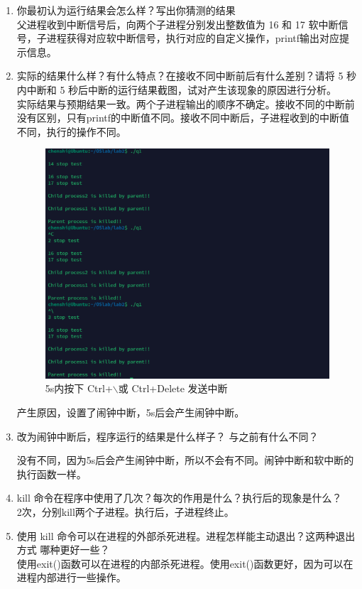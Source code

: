 \documentclass{article}
\begin{document}
    \begin{enumerate}
        \item 你最初认为运行结果会怎么样？写出你猜测的结果\\
        父进程收到中断信号后，向两个子进程分别发出整数值为 16 和 17 软中断信号，子进程获得对应软中断信号，执行对应的自定义操作，printf输出对应提示信息。
        \item 实际的结果什么样？有什么特点？在接收不同中断前后有什么差别？请将 5 秒内中断和 5 秒后中断的运行结果截图，试对产生该现象的原因进行分析。\\
        实际结果与预期结果一致。两个子进程输出的顺序不确定。接收不同的中断前没有区别，只有printf的中断值不同。接收不同中断后，子进程收到的中断值不同，执行的操作不同。

        \begin{figure}[htbp]
            \centering
            \includegraphics[scale=0.5]{picture/13.png}
            \caption{5s内按下 Ctrl+$\backslash$或 Ctrl+Delete 发送中断}
            \label{14}
        \end{figure}
        产生原因，设置了闹钟中断，5s后会产生闹钟中断。

        \item 改为闹钟中断后，程序运行的结果是什么样子？ 与之前有什么不同？
        
        没有不同，因为5s后会产生闹钟中断，所以不会有不同。闹钟中断和软中断的执行函数一样。
        \item kill 命令在程序中使用了几次？每次的作用是什么？执行后的现象是什么？\\
        2次，分别kill两个子进程。执行后，子进程终止。
        \item 使用 kill 命令可以在进程的外部杀死进程。进程怎样能主动退出？这两种退出方式
        哪种更好一些？\\
        使用exit()函数可以在进程的内部杀死进程。使用exit()函数更好，因为可以在进程内部进行一些操作。
    \end{enumerate}
\end{document}
